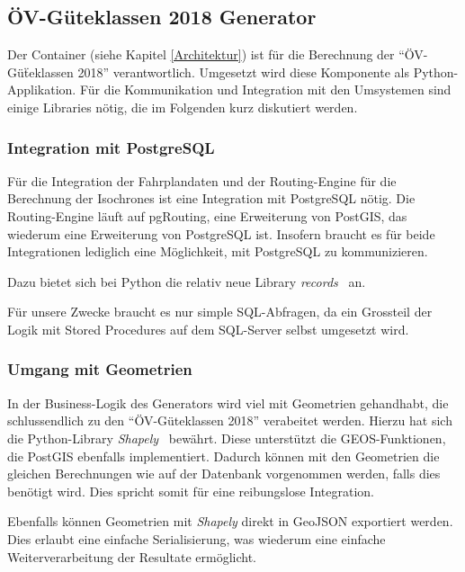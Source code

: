 \subsection{ÖV-Güteklassen 2018 Generator}
\label{Analyse:ÖV-Güteklassen 2018 Generator}

Der Container  (siehe Kapitel \ref{Architektur}) ist für die Berechnung der "`ÖV-Güẗeklassen 2018"' verantwortlich.
Umgesetzt wird diese Komponente als Python-Applikation.
Für die Kommunikation und Integration mit den Umsystemen sind einige Libraries nötig, die im Folgenden kurz diskutiert werden.

\subsubsection{Integration mit PostgreSQL}
\label{analyse_generator:Integration mit PostgreSQL}

Für die Integration der Fahrplandaten und der \gls{Routing-Engine} für die Berechnung der \glspl{Isochrone} ist eine Integration mit PostgreSQL nötig.
Die \gls{Routing-Engine} läuft auf pgRouting, eine Erweiterung von PostGIS, das wiederum eine Erweiterung von PostgreSQL ist.
Insofern braucht es für beide Integrationen lediglich eine Möglichkeit, mit PostgreSQL zu kommunizieren.

Dazu bietet sich bei Python die relativ neue Library \emph{records}~\cite{records} an.

Für unsere Zwecke braucht es nur simple SQL-Abfragen, da ein Grossteil der Logik mit \glspl{Stored Procedure} auf dem SQL-Server selbst umgesetzt wird.

\subsubsection{Umgang mit Geometrien}
\label{analyse_generator: Umgang mit Geometrien}

In der Business-Logik des Generators wird viel mit Geometrien gehandhabt, die schlussendlich zu den "`ÖV-Güteklassen 2018"' verabeitet werden.
Hierzu hat sich die Python-Library \emph{Shapely}~\cite{shapely} bewährt.
Diese unterstützt die \gls{GEOS}-Funktionen, die PostGIS ebenfalls implementiert.
Dadurch können mit den Geometrien die gleichen Berechnungen wie auf der Datenbank vorgenommen werden, falls dies benötigt wird.
Dies spricht somit für eine reibungslose Integration.

Ebenfalls können Geometrien mit \emph{Shapely} direkt in \gls{GeoJSON} exportiert werden.
Dies erlaubt eine einfache Serialisierung, was wiederum eine einfache Weiterverarbeitung der Resultate ermöglicht.

